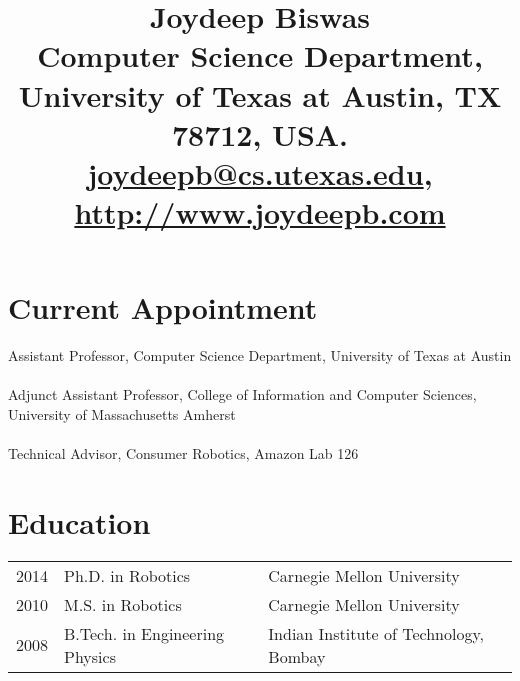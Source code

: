 \documentclass[Times]{article}
\begin{document}
\title{
\vspace{-3em}
\textbf{Joydeep Biswas}\\
\vspace{0.5em}
\normalsize{
Computer Science Department, University of Texas at Austin, TX 78712, USA.\\
\href{mailto:joydeepb@cs.utexas.edu}{joydeepb@cs.utexas.edu}, \href{http://www.joydeepb.com}{http://www.joydeepb.com}\vspace{-3em}}
}
\date{}
\maketitle


\section*{Current Appointment}

Assistant Professor, Computer Science Department,
University of Texas at Austin\\
\vspace{-0.5em}\\
Adjunct Assistant Professor, College of Information and Computer Sciences,
University of Massachusetts Amherst\\
\vspace{-0.5em}\\
Technical Advisor, Consumer Robotics, Amazon Lab 126

\section*{Education}
\begin{tabular}{ p{1.2cm} l l }
  2014  & Ph.D. in Robotics  & Carnegie Mellon University \\
  2010  & M.S. in Robotics  & Carnegie Mellon University \\
  2008  & B.Tech. in Engineering Physics & Indian Institute of Technology, Bombay \\
\end{tabular}
\end{document}
